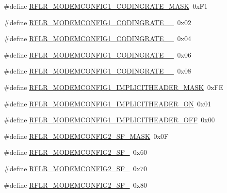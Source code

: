 \begin{DoxyCompactItemize}
\#define \hyperlink{sx1276Regs-LoRa_8h_aeb0ea5fbbb7ec90fca31ca87481597c1}{R\+F\+L\+R\+\_\+\+M\+O\+D\+E\+M\+C\+O\+N\+F\+I\+G1\+\_\+\+C\+O\+D\+I\+N\+G\+R\+A\+T\+E\+\_\+\+M\+A\+SK}~0x\+F1
\item 
\#define \hyperlink{sx1276Regs-LoRa_8h_aa7c27ea8d7dbd73e49c8516a1fce494e}{R\+F\+L\+R\+\_\+\+M\+O\+D\+E\+M\+C\+O\+N\+F\+I\+G1\+\_\+\+C\+O\+D\+I\+N\+G\+R\+A\+T\+E\+\_\+\_}~0x02
\item 
\#define \hyperlink{sx1276Regs-LoRa_8h_ac6c7a7836d0806b3c807f4e13a72d474}{R\+F\+L\+R\+\_\+\+M\+O\+D\+E\+M\+C\+O\+N\+F\+I\+G1\+\_\+\+C\+O\+D\+I\+N\+G\+R\+A\+T\+E\+\_\+\_}~0x04
\item 
\#define \hyperlink{sx1276Regs-LoRa_8h_abb6c4f6b2967084666cb7f4a3afdbfc0}{R\+F\+L\+R\+\_\+\+M\+O\+D\+E\+M\+C\+O\+N\+F\+I\+G1\+\_\+\+C\+O\+D\+I\+N\+G\+R\+A\+T\+E\+\_\+\_}~0x06
\item 
\#define \hyperlink{sx1276Regs-LoRa_8h_a48839c3cc11bc39faef3b944b148e5c4}{R\+F\+L\+R\+\_\+\+M\+O\+D\+E\+M\+C\+O\+N\+F\+I\+G1\+\_\+\+C\+O\+D\+I\+N\+G\+R\+A\+T\+E\+\_\+\_}~0x08
\item 
\#define \hyperlink{sx1276Regs-LoRa_8h_a5c3e8f169b7fd6a7c8c064f00aca22b5}{R\+F\+L\+R\+\_\+\+M\+O\+D\+E\+M\+C\+O\+N\+F\+I\+G1\+\_\+\+I\+M\+P\+L\+I\+C\+I\+T\+H\+E\+A\+D\+E\+R\+\_\+\+M\+A\+SK}~0x\+FE
\item 
\#define \hyperlink{sx1276Regs-LoRa_8h_abebb6a657cfb5c28ed1e40efaf65d41b}{R\+F\+L\+R\+\_\+\+M\+O\+D\+E\+M\+C\+O\+N\+F\+I\+G1\+\_\+\+I\+M\+P\+L\+I\+C\+I\+T\+H\+E\+A\+D\+E\+R\+\_\+\+ON}~0x01
\item 
\#define \hyperlink{sx1276Regs-LoRa_8h_ab556742d1ecaced47aa63acbb5f52500}{R\+F\+L\+R\+\_\+\+M\+O\+D\+E\+M\+C\+O\+N\+F\+I\+G1\+\_\+\+I\+M\+P\+L\+I\+C\+I\+T\+H\+E\+A\+D\+E\+R\+\_\+\+O\+FF}~0x00
\item 
\#define \hyperlink{sx1276Regs-LoRa_8h_ac76e1fabdc6072d4f6110c17b1b6d34d}{R\+F\+L\+R\+\_\+\+M\+O\+D\+E\+M\+C\+O\+N\+F\+I\+G2\+\_\+\+S\+F\+\_\+\+M\+A\+SK}~0x0F
\item 
\#define \hyperlink{sx1276Regs-LoRa_8h_a79aea3587de0d6b3d509ffb74c68cf52}{R\+F\+L\+R\+\_\+\+M\+O\+D\+E\+M\+C\+O\+N\+F\+I\+G2\+\_\+\+S\+F\+\_}~0x60
\item 
\#define \hyperlink{sx1276Regs-LoRa_8h_acc46f8d414149e44dd110e4839277386}{R\+F\+L\+R\+\_\+\+M\+O\+D\+E\+M\+C\+O\+N\+F\+I\+G2\+\_\+\+S\+F\+\_}~0x70
\item 
\#define \hyperlink{sx1276Regs-LoRa_8h_a68793443cf8e71888053c9b20b1e39b5}{R\+F\+L\+R\+\_\+\+M\+O\+D\+E\+M\+C\+O\+N\+F\+I\+G2\+\_\+\+S\+F\+\_}~0x80

\end{DoxyCompactItemize}
